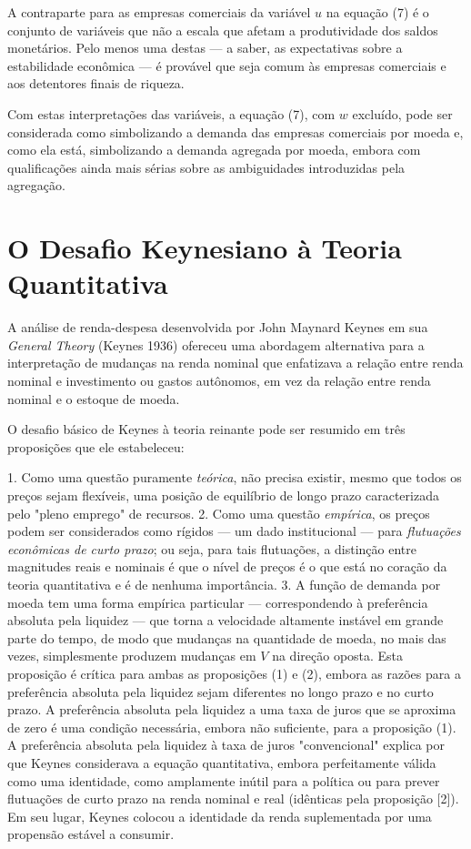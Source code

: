 \documentclass[12pt]{article}
\begin{document}
A contraparte para as empresas comerciais da variável $u$ na equação (7) é o conjunto de variáveis que não a escala que afetam a produtividade dos saldos monetários. Pelo menos uma destas — a saber, as expectativas sobre a estabilidade econômica — é provável que seja comum às empresas comerciais e aos detentores finais de riqueza.

Com estas interpretações das variáveis, a equação (7), com $w$ excluído, pode ser considerada como simbolizando a demanda das empresas comerciais por moeda e, como ela está, simbolizando a demanda agregada por moeda, embora com qualificações ainda mais sérias sobre as ambiguidades introduzidas pela agregação.

\section{O Desafio Keynesiano à Teoria Quantitativa}

A análise de renda-despesa desenvolvida por John Maynard Keynes em sua \textit{General Theory} (Keynes 1936) ofereceu uma abordagem alternativa para a interpretação de mudanças na renda nominal que enfatizava a relação entre renda nominal e investimento ou gastos autônomos, em vez da relação entre renda nominal e o estoque de moeda.

O desafio básico de Keynes à teoria reinante pode ser resumido em três proposições que ele estabeleceu:

1. Como uma questão puramente \textit{teórica}, não precisa existir, mesmo que todos os preços sejam flexíveis, uma posição de equilíbrio de longo prazo caracterizada pelo "pleno emprego" de recursos.
2. Como uma questão \textit{empírica}, os preços podem ser considerados como rígidos — um dado institucional — para \textit{flutuações econômicas de curto prazo}; ou seja, para tais flutuações, a distinção entre magnitudes reais e nominais é que o nível de preços é o que está no coração da teoria quantitativa e é de nenhuma importância.
3. A função de demanda por moeda tem uma forma empírica particular — correspondendo à preferência absoluta pela liquidez — que torna a velocidade altamente instável em grande parte do tempo, de modo que mudanças na quantidade de moeda, no mais das vezes, simplesmente produzem mudanças em $V$ na direção oposta. Esta proposição é crítica para ambas as proposições (1) e (2), embora as razões para a preferência absoluta pela liquidez sejam diferentes no longo prazo e no curto prazo. A preferência absoluta pela liquidez a uma taxa de juros que se aproxima de zero é uma condição necessária, embora não suficiente, para a proposição (1). A preferência absoluta pela liquidez à taxa de juros "convencional" explica por que Keynes considerava a equação quantitativa, embora perfeitamente válida como uma identidade, como amplamente inútil para a política ou para prever flutuações de curto prazo na renda nominal e real (idênticas pela proposição [2]). Em seu lugar, Keynes colocou a identidade da renda suplementada por uma propensão estável a consumir.
\end{document}
